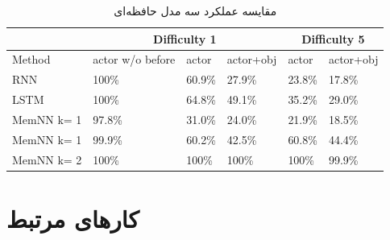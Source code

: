 \documentclass[12pt, a4paper, oneside]{report}
\begin{document}
\begin{table}[!ht]
    \begin{small}
    \begin{center}
      \begin{latin}
      \begin{tabular}{|l||l|l|l||l|l|}
        \hline
         & \multicolumn{3}{c|}{Difficulty 1} & \multicolumn{2}{c|}{Difficulty 5} \\
        \hline
        Method & actor w/o before & actor & actor+obj & actor & actor+obj \\
        \hline
        RNN & 100\% & 60.9\% & 27.9\% & 23.8\% & 17.8\% \\
        LSTM & 100\% & 64.8\% & 49.1\% & 35.2\% & 29.0\% \\
        \hline
        MemNN k= 1 & 97.8\% & 31.0\% & 24.0\% & 21.9\% & 18.5\% \\
        MemNN k= 1 & 99.9\% & 60.2\% & 42.5\% & 60.8\% & 44.4\% \\
        MemNN k= 2 & 100\% & 100\% & 100\% & 100\% & 99.9\% \\
        \hline
      \end{tabular}
      \end{latin}
      \caption{مقایسه عملکرد سه مدل حافظه‌ای}
      \label{tab:MemNN-vs-others}
    \end{center}
    \end{small}
\end{table}


\chapter{کارهای مرتبط}
\pagebreak

\end{document}
